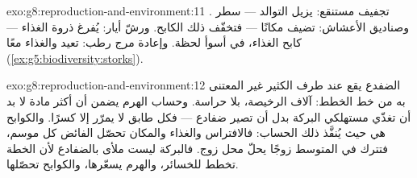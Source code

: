 \begin{solution}{exo:g8:reproduction-and-environment:11}
تجفيف مستنقع: يزيل  التوالد --- سطر . وصناديق الأعشاش:
تضيف مكانًا --- فتخفّف ذلك الكابح. ورشّ أيار: يُفرغ ذروة الغذاء ---
كابح الغذاء، في أسوأ لحظة. وإعادة مرج رطب: تعيد  والغذاء معًا
(\cref{ex:g5:biodiversity:storks}).
\end{solution}

\begin{solution}{exo:g8:reproduction-and-environment:12}
الضفدع يقع عند طرف الكثير غير المعتنى به من خط الخطط: آلاف 
الرخيصة، بلا حراسة. وحساب الهرم يضمن أن أكثر مادة  لا بد
أن تغذّي مستهلكي البركة بدل أن تصير ضفادع --- فكل طابق لا يمرّر إلا
كسرًا. والكوابح هي حيث يُنفَّذ ذلك الحساب: فالافتراس والغذاء
والمكان  تحصّل الفائض كل موسم، فتترك في المتوسط زوجًا يحلّ
محل زوج. فالبركة ليست ملأى بالضفادع لأن الخطة تخطط للخسائر، والهرم
يسعّرها، والكوابح تحصّلها.
\end{solution}

